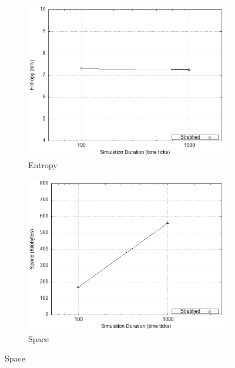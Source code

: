 \documentclass[logo,msc,cyber]{infthesis}   %
\begin{document}
\begin{figure}[h!]
    \centering
    \begin{subfigure}[b]{0.45\textwidth}
        \centering
        \includegraphics[width=\textwidth]{figures/baseline_simulation/mixim/baseline_mixim_entropy.png}
        \caption{Entropy}
        \label{fig:baseline-mixim-entropy}
    \end{subfigure}
    \hfill
    \begin{subfigure}[b]{0.45\textwidth}
        \centering
        \includegraphics[width=\textwidth]{figures/baseline_simulation/mixim/baseline_mixim_space.png}
        \caption{Space}
        \label{fig:baseline-mixim-space}
    \end{subfigure}

\end{figure}
\end{document}
